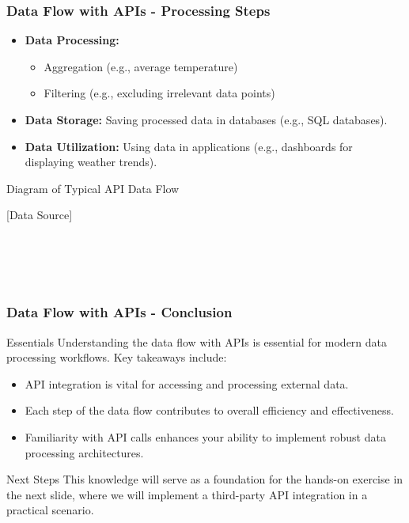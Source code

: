 \documentclass[aspectratio=169]{beamer}
\begin{document}
\begin{frame}[fragile]
  \frametitle{Data Flow with APIs - Processing Steps}
  \begin{itemize}
    \item \textbf{Data Processing:} 
      \begin{itemize}
        \item Aggregation (e.g., average temperature) 
        \item Filtering (e.g., excluding irrelevant data points)
      \end{itemize}
    \item \textbf{Data Storage:} Saving processed data in databases (e.g., SQL databases).
    \item \textbf{Data Utilization:} Using data in applications (e.g., dashboards for displaying weather trends).
  \end{itemize}
  
  \begin{block}{Diagram of Typical API Data Flow}
  \begin{center}
  [Data Source] 
      \\  
      \\  
      \\  
      \\  
      \\ 
  \end{center}
  \end{block}
\end{frame}

\begin{frame}[fragile]
  \frametitle{Data Flow with APIs - Conclusion}
  \begin{block}{Essentials}
  Understanding the data flow with APIs is essential for modern data processing workflows. Key takeaways include:
  \end{block}
  
  \begin{itemize}
    \item API integration is vital for accessing and processing external data.
    \item Each step of the data flow contributes to overall efficiency and effectiveness.
    \item Familiarity with API calls enhances your ability to implement robust data processing architectures.
  \end{itemize}
  
  \begin{block}{Next Steps}
  This knowledge will serve as a foundation for the hands-on exercise in the next slide, where we will implement a third-party API integration in a practical scenario.
  \end{block}
\end{frame}
\end{document}
